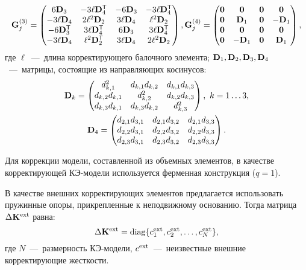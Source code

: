 \begin{equation*}
	\mathbf{G}_j^{(3)} =
	\begin{pmatrix}
		6 \mathbf{D}_3 & -3 \ell \mathbf{D} ^ \mathsf{T}_4 & -6 \mathbf{D}_3 & -3 \ell \mathbf{D} ^ \mathsf{T}_4 \\
		-3 \ell \mathbf{D}_4 & 2 \ell ^ 2 \mathbf{D}_2 & 3 \ell \mathbf{D}_4 & \ell ^ 2 \mathbf{D}_2 \\
		-6 \mathbf{D} ^ \mathsf{T}_3 & 3 \ell \mathbf{D} ^ \mathsf{T}_4 & 6 \mathbf{D}_3 & 3 \ell \mathbf{D} ^ \mathsf{T}_4 \\
		-3 \ell \mathbf{D}_4 & \ell ^ 2 \mathbf{D} ^ \mathsf{T}_2 & 3 \ell \mathbf{D}_4 & 2 \ell ^ 2 \mathbf{D}_2
	\end{pmatrix},
	\mathbf{G}_j^{(4)} =
	\begin{pmatrix}
		\mathbf{0} & \mathbf{0} & \mathbf{0} & \mathbf{0} \\
		\mathbf{0} & \mathbf{D}_1 & \mathbf{0} & -\mathbf{D}_1 \\
		\mathbf{0} & \mathbf{0} & \mathbf{0} & \mathbf{0} \\
		\mathbf{0} & -\mathbf{D}_1 & \mathbf{0} & \mathbf{D}_1 \\
	\end{pmatrix},
\end{equation*}
где $ \ell $~---~длина корректирующего балочного элемента; $ \mathbf{D}_1, \mathbf{D}_2, \mathbf{D}_3, \mathbf{D}_4 $~---~матрицы, состоящие из направляющих косинусов:
\begin{gather*}
	\mathbf{D}_k = 
	\begin{pmatrix}
		d_{k, 1}^2 & d_{k, 1} d_{k, 2} & d_{k, 1} d_{k, 3} \\
		d_{k, 2} d_{k, 1} & d_{k, 2} ^ 2 & d_{k, 2} d_{k, 3} \\
		d_{k, 3} d_{k, 1} & d_{k, 3} d_{k, 2} & d_{k, 3} ^ 2
	\end{pmatrix}, \ k = 1 \hdots 3, \\
	\mathbf{D}_4 = 
	\begin{pmatrix}
		d_{2, 1} d_{3, 1} & d_{2, 1} d_{3, 2} & d_{2, 1} d_{3, 3} \\
		d_{2, 2} d_{3, 1} & d_{2, 2} d_{3, 2} & d_{2, 2} d_{3, 3} \\
		d_{2, 3} d_{3, 1} & d_{2, 3} d_{3, 2} & d_{2, 3} d_{3, 3}
	\end{pmatrix}.
\end{gather*}

Для коррекции модели, составленной из объемных элементов, в качестве корректирующей КЭ-модели используется ферменная конструкция ($ q = 1 $). 

В качестве внешних корректирующих элементов предлагается использовать пружинные опоры, прикрепленные к неподвижному основанию. Тогда матрица $ \Delta \mathbf{K} ^ {\text{ext}} $ равна:
\begin{equation}
	\Delta \mathbf{K} ^ {\text{ext}} = \operatorname{diag} \{ c ^ {\text{ext}}_1, c ^ {\text{ext}}_2, \hdots, c ^ {\text{ext}}_N \},
\end{equation}
где $ N $~---~размерность КЭ-модели, $ c ^ {\text{ext}} $~---~неизвестные внешние корректирующие жесткости. 

